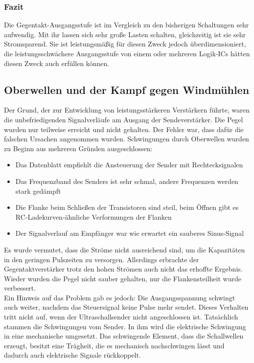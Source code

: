 \subsubsection{Fazit}
Die Gegentakt-Ausgangsstufe ist im Vergleich zu den bisherigen Schaltungen sehr aufwendig. Mit ihr lassen sich sehr große Lasten schalten, gleichzeitig ist sie sehr Stromsparend. Sie ist leistungsmäßig für diesen Zweck jedoch überdimensioniert, die leistungsschwächere Ausgangsstufe von einem oder mehreren Logik-ICs hätten diesen Zweck auch erfüllen können.


\subsection{Oberwellen und der Kampf gegen Windmühlen} %
Der Grund, der zur Entwicklung von leistungsstärkeren Verstärkern führte, waren die unbefriedigenden Signalverläufe am Ausgang der Sendeverstärker. Die Pegel wurden nur teilweise erreicht und nicht gehalten. Der Fehler war, dass dafür die falschen Ursachen angenommen wurden. Schwingungen durch Oberwellen wurden zu Beginn aus mehreren Gründen ausgeschlossen:
\begin{itemize}
	\item Das Datenblatt empfiehlt die Ansteuerung der Sender mit Rechtecksignalen
	\item Das Frequenzband des Senders ist sehr schmal, andere Frequenzen werden stark gedämpft
	\item Die Flanke beim Schließen der Transistoren sind steil, beim Öffnen gibt es RC-Ladekurven-ähnliche Verformungen der Flanken
	\item Der Signalverlauf am Empfänger war wie erwartet ein sauberes Sinus-Signal
\end{itemize}
Es wurde vermutet, dass die Ströme nicht ausreichend sind, um die Kapazitäten in den geringen Pulszeiten zu versorgen. Allerdings erbrachte der Gegentaktverstärker trotz den hohen Strömen auch nicht das erhoffte Ergebnis. Wieder wurden die Pegel nicht sauber gehalten, nur die Flankensteilheit wurde verbessert.\\
Ein Hinweis auf das Problem gab es jedoch: Die Ausgangsspannung schwingt auch weiter, nachdem das Steuersignal keine Pulse mehr sendet. Dieses Verhalten tritt nicht auf, wenn der Ultraschallsender nicht angeschlossen ist. Tatsächlich stammen die Schwingungen vom Sender. In ihm wird die elektrische Schwingung in eine mechanische umgesetzt. Das schwingende Element, dass die Schallwellen erzeugt, besitzt eine Trägheit, die es mechanisch nachschwingen lässt und dadurch auch elektrische Signale rückkoppelt.\\ %
